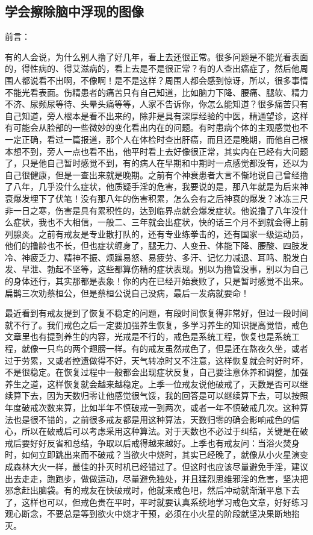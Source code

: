 \subsection{学会擦除脑中浮现的图像}

前言：

有的人会说，为什么别人撸了好几年，看上去还很正常。很多问题是不能光看表面的，得性病的、得艾滋病的，看上去是不是很正常？有的人查出癌症了，然后他周围人都说看不出啊，不像啊！是不是这样？周围人都会感到惊讶，所以，很多事情不能光看表面。伤精患者的痛苦只有自己知道，比如脑力下降、腰痛、腿软、精力不济、尿频尿等待、头晕头痛等等，人家不告诉你，你怎么能知道？很多痛苦只有自己知道，旁人根本是看不出来的，除非是具有深厚经验的中医，精通望诊，这样有可能会从脸部的一些微妙的变化看出内在的问题。有时患病个体的主观感觉也不一定正确，看过一篇报道，那个人在体检时查出肝癌，而且还是晚期，而他自己根本想不到，旁人一点也看不出，他平时看上去好像很正常，其实内在已经有大问题了，只是他自己暂时感觉不到，有的病人在早期和中期时一点感觉都没有，还以为自己很健康，但是一查出来就是晚期。之前有个神衰患者大言不惭地说自己曾经撸了八年，几乎没什么症状，他质疑手淫的危害，我要说的是，那八年就是为后来神衰爆发埋下了伏笔！没有那八年的伤害积累，怎么会有之后神衰的爆发？冰冻三尺非一日之寒，伤害是具有累积性的，达到临界点就会爆发症状。他说撸了八年没什么症状，我也不大相信，一般二、三年就会出症状，快的话三个月不到就会得上前列腺炎。之前有戒友是专业散打队的，还有专业练拳击的，还有国家一级运动员，他们的撸龄也不长，但也症状缠身了，腿无力、人变丑、体能下降、腰酸、四肢发冷、神疲乏力、精神不振、烦躁易怒、易疲劳、多汗、记忆力减退、耳鸣、脱发白发、早泄、勃起不坚等，这些都算伤精的症状表现。别以为撸管没事，别以为自己的身体还行，其实那都是表象！你的内在已经开始衰败了，只是暂时感觉不出来。扁鹊三次劝蔡桓公，但是蔡桓公说自己没病，最后一发病就要命！

最近看到有戒友提到了恢复不稳定的问题，有段时间恢复得非常好，但过一段时间就不行了。我们戒色之后一定要加强养生恢复，多学习养生的知识提高觉悟，戒色文章里也有提到养生的内容，光戒是不行的，戒色是系统工程，恢复也是系统工程，就像一只鸟的两个翅膀一样。有的戒友虽然戒色了，但是还在熬夜久坐，或者过于劳累，又或者控遗做得不好，天气转凉时又不注意，这样恢复就会时好时坏，不是很稳定。在恢复过程中一般都会出现症状反复，自己要注意休养和调整，加强养生之道，这样恢复就会越来越稳定。上季一位戒友说他破戒了，天数是否可以继续算下去，因为天数归零让他感觉很气馁，我的回答是可以继续算下去，可以按照年度破戒次数来算，比如半年不慎破戒一到两次，或者一年不慎破戒几次。这种算法也是很不错的，之前很多戒友都是用这种算法，天数归零的确会影响戒色的信心，所以在破戒后可以考虑采用这种算法。对于天数也不必过于纠结，关键是在破戒后要好好反省和总结，争取以后戒得越来越好。上季也有戒友问：当浴火焚身时，如何立即跳出来而不破戒？当欲火中烧时，其实已经晚了，就像从小火星演变成森林大火一样，最佳的扑灭时机已经错过了。但这时也应该尽量避免手淫，建议出去走走，跑跑步，做做运动，尽量避免独处，并且猛烈思维邪淫的危害，坚决把邪念赶出脑袋。有的戒友在快破戒时，他就来戒色吧，然后冲动就渐渐平息下去了，这样也可以，但戒色贵在平时，平时就要认真系统地学习戒色文章，好好练习观心断念，不要总是等到欲火中烧才干预，必须在小火星的阶段就坚决果断地掐灭。

